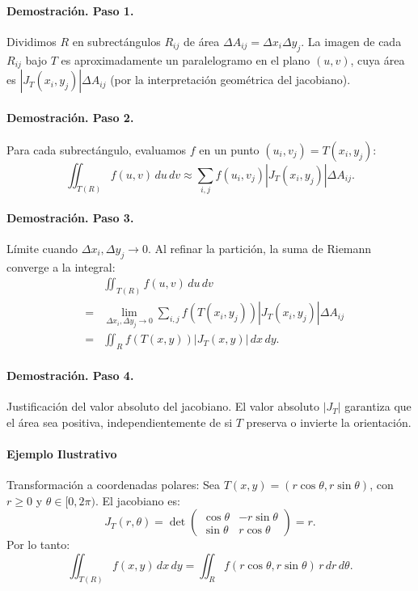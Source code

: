 \documentclass[11pt]{book}
\theoremstyle{definicion}
\theoremstyle{teorema}
\theoremstyle{ejemplo}
\begin{document}
\paragraph{Demostración. Paso 1.}
%
Dividimos \( R \) en subrectángulos \( R_{ij} \) de área \( \Delta A_{ij} = \Delta x_i \Delta y_j \). La imagen de cada \( R_{ij} \) bajo \( T \) es aproximadamente un paralelogramo en el plano \( (u,v) \), cuya área es \( |J_T(x_i,y_j)| \Delta A_{ij} \) (por la interpretación geométrica del jacobiano).

\paragraph{Demostración. Paso 2.}
Para cada subrectángulo, evaluamos \( f \) en un punto \( (u_i,v_j) = T(x_i,y_j) \):
\[
\iint_{T(R)} f(u,v) \, du \, dv \approx \sum_{i,j} f(u_i,v_j) |J_T(x_i,y_j)| \Delta A_{ij}.
\]

\paragraph{Demostración. Paso 3.}
Límite cuando \( \Delta x_i, \Delta y_j \to 0 \).
Al refinar la partición, la suma de Riemann converge a la integral:
\begin{eqnarray*}
&&\iint_{T(R)} f(u,v) \, du \, dv \\&=& \lim_{\Delta x_i, \Delta y_j \to 0} \sum_{i,j} f(T(x_i,y_j)) |J_T(x_i,y_j)| \Delta A_{ij}\\ &=& \iint_{R} f(T(x,y)) |J_T(x,y)| \, dx \, dy.    
\end{eqnarray*}

\paragraph{Demostración. Paso 4.}
Justificación del valor absoluto del jacobiano.
El valor absoluto \( |J_T| \) garantiza que el área sea positiva, independientemente de si \( T \) preserva o invierte la orientación.

\paragraph{Ejemplo Ilustrativo}
Transformación a coordenadas polares:
Sea \( T(x,y) = (r \cos \theta, r \sin \theta) \), con \( r \geq 0 \) y \( \theta \in [0, 2\pi) \). El jacobiano es:
\[
J_T(r,\theta) = \det \begin{pmatrix}
\cos \theta & -r \sin \theta \\
\sin \theta & r \cos \theta
\end{pmatrix} = r.
\]
Por lo tanto:
\[
\iint_{T(R)} f(x,y) \, dx \, dy = \iint_{R} f(r \cos \theta, r \sin \theta) \, r \, dr \, d\theta.
\]
\end{document}
